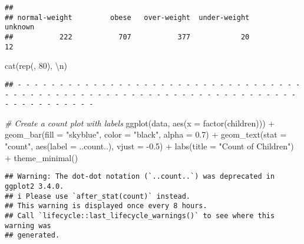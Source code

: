 \documentclass[
]{article}
\newenvironment{Shaded}{\begin{snugshade}}{\end{snugshade}}
\newcommand{\AttributeTok}[1]{\textcolor[rgb]{0.77,0.63,0.00}{#1}}
\newcommand{\CommentTok}[1]{\textcolor[rgb]{0.56,0.35,0.01}{\textit{#1}}}
\newcommand{\DecValTok}[1]{\textcolor[rgb]{0.00,0.00,0.81}{#1}}
\newcommand{\FloatTok}[1]{\textcolor[rgb]{0.00,0.00,0.81}{#1}}
\newcommand{\FunctionTok}[1]{\textcolor[rgb]{0.00,0.00,0.00}{#1}}
\newcommand{\NormalTok}[1]{#1}
\newcommand{\SpecialCharTok}[1]{\textcolor[rgb]{0.00,0.00,0.00}{#1}}
\newcommand{\StringTok}[1]{\textcolor[rgb]{0.31,0.60,0.02}{#1}}
\begin{document}
\begin{verbatim}
## 
## normal-weight         obese   over-weight  under-weight       unknown 
##           222           707           377            20            12
\end{verbatim}

\begin{Shaded}
\begin{Highlighting}[]
\FunctionTok{cat}\NormalTok{(}\FunctionTok{rep}\NormalTok{(}\StringTok{\textquotesingle{}{-}\textquotesingle{}}\NormalTok{, }\DecValTok{80}\NormalTok{), }\StringTok{\textquotesingle{}}\SpecialCharTok{\textbackslash{}n}\StringTok{\textquotesingle{}}\NormalTok{)}
\end{Highlighting}
\end{Shaded}

\begin{verbatim}
## - - - - - - - - - - - - - - - - - - - - - - - - - - - - - - - - - - - - - - - - - - - - - - - - - - - - - - - - - - - - - - - - - - - - - - - - - - - - - - - -
\end{verbatim}

\begin{Shaded}
\begin{Highlighting}[]
\CommentTok{\# Create a count plot with labels}
\FunctionTok{ggplot}\NormalTok{(data, }\FunctionTok{aes}\NormalTok{(}\AttributeTok{x =} \FunctionTok{factor}\NormalTok{(children))) }\SpecialCharTok{+}
  \FunctionTok{geom\_bar}\NormalTok{(}\AttributeTok{fill =} \StringTok{"skyblue"}\NormalTok{, }\AttributeTok{color =} \StringTok{"black"}\NormalTok{, }\AttributeTok{alpha =} \FloatTok{0.7}\NormalTok{) }\SpecialCharTok{+}
  \FunctionTok{geom\_text}\NormalTok{(}\AttributeTok{stat =} \StringTok{"count"}\NormalTok{, }\FunctionTok{aes}\NormalTok{(}\AttributeTok{label =}\NormalTok{ ..count..), }\AttributeTok{vjust =} \SpecialCharTok{{-}}\FloatTok{0.5}\NormalTok{) }\SpecialCharTok{+}
  \FunctionTok{labs}\NormalTok{(}\AttributeTok{title =} \StringTok{"Count of Children"}\NormalTok{) }\SpecialCharTok{+}
  \FunctionTok{theme\_minimal}\NormalTok{()}
\end{Highlighting}
\end{Shaded}

\begin{verbatim}
## Warning: The dot-dot notation (`..count..`) was deprecated in ggplot2 3.4.0.
## i Please use `after_stat(count)` instead.
## This warning is displayed once every 8 hours.
## Call `lifecycle::last_lifecycle_warnings()` to see where this warning was
## generated.
\end{verbatim}
\end{document}
